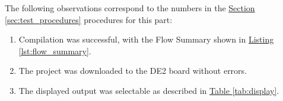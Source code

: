 The following observations correspond to the numbers in the \hyperref[sec:test_procedures]{Section \ref*{sec:test_procedures}} procedures for this part:

\begin{enumerate}
    \item Compilation was successful, with the Flow Summary shown in \hyperref[lst:flow_summary]{Listing \ref*{lst:flow_summary}}.
    \item The project was downloaded to the DE2 board without errors.
    \item The displayed output was selectable as described in \hyperref[tab:display]{Table \ref*{tab:display}}.
\end{enumerate}




